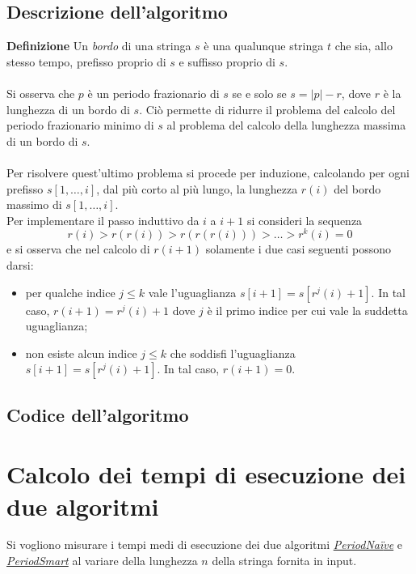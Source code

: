 \documentclass[11pt,a4paper]{article}
\begin{document}
\subsection{Descrizione dell'algoritmo}
\textbf{Definizione} Un \textit{bordo} di una stringa $s$ è una qualunque stringa $t$ che sia, allo stesso tempo, prefisso proprio di $s$ e suffisso proprio di $s$.\\
\\
Si osserva che $p$ è un periodo frazionario di $s$ se e solo se $s = |p|-r$, dove $r$ è la lunghezza di un bordo di $s$. Ciò permette di ridurre il problema del calcolo del periodo frazionario minimo di $s$ al problema del calcolo della lunghezza massima di un bordo di $s$.\\ 
\\
Per risolvere quest'ultimo problema si procede per induzione, calcolando per ogni prefisso $s[1,\dots,i]$, dal più corto al più lungo, la lunghezza $r(i)$ del bordo massimo di $s[1,\dots,i]$.\\
Per implementare il passo induttivo da $i$ a $i+1$ si consideri la sequenza
\begin{equation*}
r(i)>r(r(i))>r(r(r(i)))>\dots>r^{k}(i)=0
\end{equation*}
e si osserva che nel calcolo di $r(i+1)$ solamente i due casi seguenti possono darsi:
\begin{itemize}
\item per qualche indice $j \leq k$ vale l'uguaglianza $s[i+1] = s[r^{j}(i)+1]$. In tal caso, $r(i+1) = r^{j}(i)+1$ dove $j$ è il primo indice per cui vale la suddetta uguaglianza;
\item non esiste alcun indice $j \leq k$ che soddisfi l'uguaglianza $s[i+1] = s[r^{j}(i)+1]$. In tal caso, $r(i+1) = 0$.
\end{itemize}

\subsection{Codice dell'algoritmo}
 



\section{Calcolo dei tempi di esecuzione dei due algoritmi}
Si vogliono misurare i tempi medi di esecuzione dei due algoritmi \hyperlink{section.2}{\textit{PeriodNa{\"i}ve}} e \hyperlink{section.3}{\textit{PeriodSmart}} al variare della lunghezza $n$ della stringa fornita in input.\\
\end{document}
